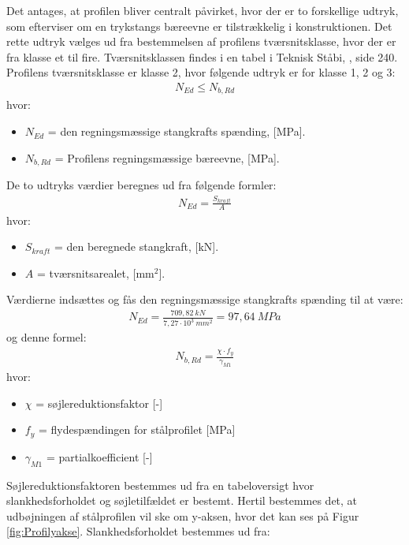 Det antages, at profilen bliver centralt påvirket, hvor der er to forskellige udtryk, som efterviser om en trykstangs bæreevne er tilstrækkelig i konstruktionen. Det rette udtryk vælges ud fra bestemmelsen af profilens tværsnitsklasse, hvor der er fra klasse et til fire. Tværsnitsklassen findes i en tabel i Teknisk Ståbi, \citep{TekniskStobi}, side 240. Profilens tværsnitsklasse er klasse 2, hvor følgende udtryk er for klasse 1, 2 og 3:
\begin{align}
 N_{Ed} \leq N_{b,Rd}
 \label{lig:Bæreevne}
\end{align}
hvor: 
\begin{itemize}
\item $N_{Ed}$ = den regningsmæssige stangkrafts spænding, [MPa].
\item $N_{b,Rd}$ = Profilens regningsmæssige bæreevne, [MPa].
\end{itemize}
De to udtryks værdier beregnes ud fra følgende formler:
\begin{align*}
 N_{Ed}= \frac{S_{kraft}}{A}
\end{align*} 
hvor:
\begin{itemize}
\item $S_{kraft}$ = den beregnede stangkraft, [kN].
\item $A$ = tværsnitsarealet, [mm$^2$].
\end{itemize}
Værdierne indsættes og fås den regningsmæssige stangkrafts spænding til at være:
\begin{align*}
N_{Ed} = \frac{709,82 \SI{}{kN}}{7,27 \cdot 10^3 \SI{}{mm^2}} = 97,64 \SI{}{MPa}
\end{align*}
og denne formel:
 \begin{align*}
N_{b,Rd}  = \frac{\chi \cdot f_y  }{\gamma_{M1}}
 \end{align*}
hvor: 
\begin{itemize}
\item $\chi$ = søjlereduktionsfaktor [-]
\item $f_y$ = flydespændingen for stålprofilet [MPa]
\item $\gamma_{M1}$ = partialkoefficient [-]
\end{itemize} 

Søjlereduktionsfaktoren bestemmes ud fra en tabeloversigt hvor slankhedsforholdet og søjletilfældet er bestemt. Hertil bestemmes det, at udbøjningen af stålprofilen vil ske om y-aksen, hvor det kan ses på Figur \ref{fig:Profilyakse}. Slankhedsforholdet bestemmes ud fra:

